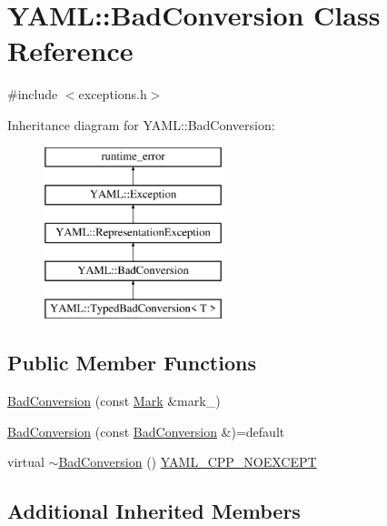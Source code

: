 \hypertarget{class_y_a_m_l_1_1_bad_conversion}{}\section{Y\+A\+ML\+::Bad\+Conversion Class Reference}
\label{class_y_a_m_l_1_1_bad_conversion}


{\ttfamily \#include $<$exceptions.\+h$>$}

Inheritance diagram for Y\+A\+ML\+::Bad\+Conversion\+:\begin{figure}[H]
\begin{center}
\leavevmode
\includegraphics[height=5.000000cm]{class_y_a_m_l_1_1_bad_conversion}
\end{center}
\end{figure}
\subsection*{Public Member Functions}
\begin{DoxyCompactItemize}
\item 
\mbox{\hyperlink{class_y_a_m_l_1_1_bad_conversion_a3b9363f4a2a558fde5c612d1b404fce4}{Bad\+Conversion}} (const \mbox{\hyperlink{struct_y_a_m_l_1_1_mark}{Mark}} \&mark\+\_\+)
\item 
\mbox{\hyperlink{class_y_a_m_l_1_1_bad_conversion_a7193fd2c22a3724030e150a32f2d9d23}{Bad\+Conversion}} (const \mbox{\hyperlink{class_y_a_m_l_1_1_bad_conversion}{Bad\+Conversion}} \&)=default
\item 
virtual \mbox{\hyperlink{class_y_a_m_l_1_1_bad_conversion_a95693c5708a5e35969e0010dbcd5ef36}{$\sim$\+Bad\+Conversion}} () \mbox{\hyperlink{exceptions_8cpp_a4ea58eb0a28000364858d4942add7d1a}{Y\+A\+M\+L\+\_\+\+C\+P\+P\+\_\+\+N\+O\+E\+X\+C\+E\+PT}}
\end{DoxyCompactItemize}
\subsection*{Additional Inherited Members}


